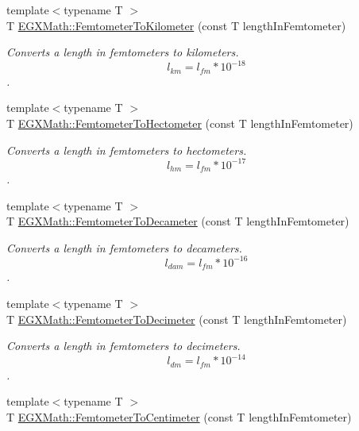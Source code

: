 \begin{DoxyCompactItemize}
{\footnotesize template$<$typename T $>$ }\\T \mbox{\hyperlink{group___e_g_x_math-_conversions-_length_conversions-_s_i-_femtometer-_s_i_ga539d33a130ba1069fe9dfaea944cd4ed}{E\+G\+X\+Math\+::\+Femtometer\+To\+Kilometer}} (const T length\+In\+Femtometer)
\begin{DoxyCompactList}\small\item\em Converts a length in femtometers to kilometers. \[ l_{km}=l_{fm} * 10^{-18} \]. \end{DoxyCompactList}\item 
{\footnotesize template$<$typename T $>$ }\\T \mbox{\hyperlink{group___e_g_x_math-_conversions-_length_conversions-_s_i-_femtometer-_s_i_gae889d6c7cbcb59336da14db49d503935}{E\+G\+X\+Math\+::\+Femtometer\+To\+Hectometer}} (const T length\+In\+Femtometer)
\begin{DoxyCompactList}\small\item\em Converts a length in femtometers to hectometers. \[ l_{hm}=l_{fm} * 10^{-17} \]. \end{DoxyCompactList}\item 
{\footnotesize template$<$typename T $>$ }\\T \mbox{\hyperlink{group___e_g_x_math-_conversions-_length_conversions-_s_i-_femtometer-_s_i_ga8d583b77d39b4474a8081997067ffb66}{E\+G\+X\+Math\+::\+Femtometer\+To\+Decameter}} (const T length\+In\+Femtometer)
\begin{DoxyCompactList}\small\item\em Converts a length in femtometers to decameters. \[ l_{dam}=l_{fm} * 10^{-16} \]. \end{DoxyCompactList}\item 
{\footnotesize template$<$typename T $>$ }\\T \mbox{\hyperlink{group___e_g_x_math-_conversions-_length_conversions-_s_i-_femtometer-_s_i_gad0f3dba7d53c7f17223b7f7b0f4db523}{E\+G\+X\+Math\+::\+Femtometer\+To\+Decimeter}} (const T length\+In\+Femtometer)
\begin{DoxyCompactList}\small\item\em Converts a length in femtometers to decimeters. \[ l_{dm}=l_{fm} * 10^{-14} \]. \end{DoxyCompactList}\item 
{\footnotesize template$<$typename T $>$ }\\T \mbox{\hyperlink{group___e_g_x_math-_conversions-_length_conversions-_s_i-_femtometer-_s_i_ga9a7e58a22b438341f8fffc8d78dd8483}{E\+G\+X\+Math\+::\+Femtometer\+To\+Centimeter}} (const T length\+In\+Femtometer)

\end{DoxyCompactItemize}

